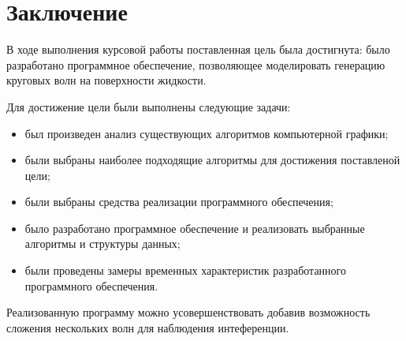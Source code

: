 \chapter*{Заключение}

В ходе выполнения курсовой работы поставленная цель была достигнута: 
было разработано программное обеспечение, позволяющее моделировать 
генерацию круговых волн на поверхности жидкости.

Для достижение цели были выполнены следующие задачи:
\begin{itemize}
    \item был произведен анализ существующих алгоритмов компьютерной графики;
    \item были выбраны наиболее подходящие алгоритмы для достижения поставленой цели;
    \item были выбраны средства реализации программного обеспечения;
    \item было разработано программное обеспечение и реализовать выбранные алгоритмы и структуры данных;
    \item были проведены замеры временных характеристик разработанного программного обеспечения.
\end{itemize}

Реализованную программу можно усовершенствовать добавив возможность сложения нескольких волн для наблюдения интеференции.
